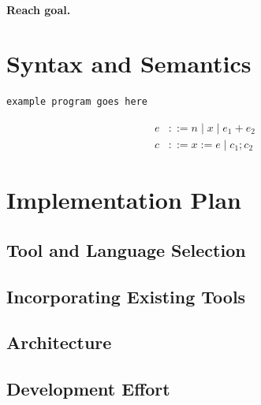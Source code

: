 \documentclass[12pt, letterpaper]{article}
\begin{document}
\paragraph{Reach goal.}

\section{Syntax and Semantics}

\begin{lstlisting}
example program goes here
\end{lstlisting}

\begin{align*}
  e &::= n \mid x \mid e_1 + e_2 \\
  c &::= x := e \mid c_1; c_2
\end{align*}

\section{Implementation Plan}

\subsection{Tool and Language Selection}

\subsection{Incorporating Existing Tools}

\subsection{Architecture}


\subsection{Development Effort}
\end{document}

